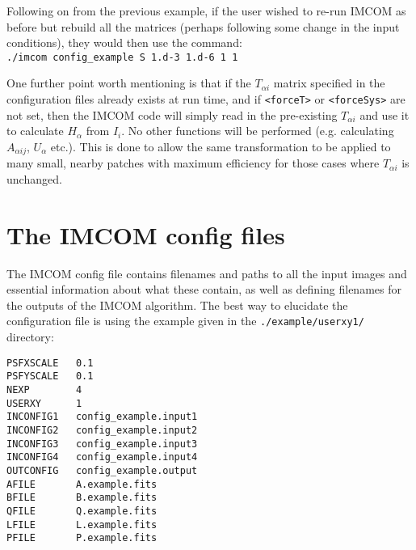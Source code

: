\documentclass[10pt]{article}
\begin{document}
Following on from the previous example, if the user wished to re-run IMCOM as before but rebuild all the matrices (perhaps following some change in the input conditions), they would then use the command:
\\ \newline
\texttt{./imcom config\_example S 1.d-3 1.d-6 1 1}
\newline

One further point worth mentioning is that if the $T_{\alpha i}$ matrix specified in the configuration files already exists at run time, and if \texttt{<forceT>} or \texttt{<forceSys>} are not set, then the IMCOM code will simply read in the pre-existing $T_{\alpha i}$ and use it to calculate $H_{\alpha}$ from $I_i$.  No other functions will be performed (e.g. calculating $A_{\alpha i j}$, $U_{\alpha}$ etc.).  This is done to allow the same transformation to be applied to many small, nearby patches with maximum efficiency for those cases where $T_{\alpha i }$ is unchanged.

\section{The IMCOM config files}\label{sect:config}
The IMCOM config file contains filenames and paths to all the input images and essential information about what these contain, as well as defining filenames for the outputs of the IMCOM algorithm. 
The best way to elucidate the configuration file is using the example given in the \texttt{./example/userxy1/} directory:

\texttt{PSFXSCALE~~~0.1 \\
PSFYSCALE~~~0.1 \\
NEXP~~~~~~~~4 \\
USERXY~~~~~~1 \\
INCONFIG1~~~config\_example.input1 \\
INCONFIG2~~~config\_example.input2 \\
INCONFIG3~~~config\_example.input3 \\
INCONFIG4~~~config\_example.input4 \\
OUTCONFIG~~~config\_example.output \\
AFILE~~~~~~~A.example.fits \\
BFILE~~~~~~~B.example.fits \\
QFILE~~~~~~~Q.example.fits \\
LFILE~~~~~~~L.example.fits \\
PFILE~~~~~~~P.example.fits   }
\end{document}
